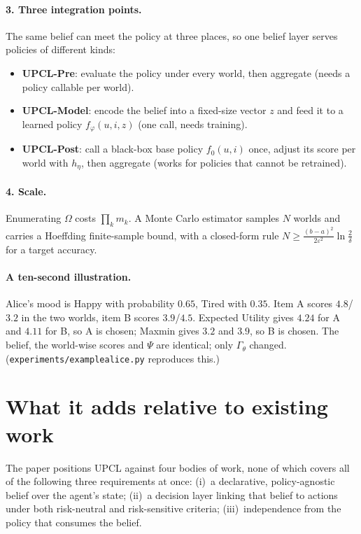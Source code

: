 \documentclass[11pt]{article}
\newcommand{\code}[1]{{\renewcommand{\_}{\textunderscore\hspace{0pt}}\texttt{#1}}}
\begin{document}
\paragraph{3. Three integration points.} The same belief can meet the policy at three places, so one belief layer serves policies of different kinds:
\begin{itemize}
\item \textbf{UPCL-Pre}: evaluate the policy under every world, then aggregate (needs a policy callable per world).
\item \textbf{UPCL-Model}: encode the belief into a fixed-size vector $z$ and feed it to a learned policy $f_\varphi(u,i,z)$ (one call, needs training).
\item \textbf{UPCL-Post}: call a black-box base policy $f_0(u,i)$ once, adjust its score per world with $h_\eta$, then aggregate (works for policies that cannot be retrained).
\end{itemize}

\paragraph{4. Scale.} Enumerating $\Omega$ costs $\prod_k m_k$. A Monte Carlo estimator samples $N$ worlds and carries a Hoeffding finite-sample bound, with a closed-form rule $N\ge\frac{(b-a)^2}{2\varepsilon^2}\ln\frac{2}{\delta}$ for a target accuracy.

\paragraph{A ten-second illustration.} Alice's mood is Happy with probability $0.65$, Tired with $0.35$. Item A scores $4.8$/$3.2$ in the two worlds, item B scores $3.9$/$4.5$. Expected Utility gives $4.24$ for A and $4.11$ for B, so A is chosen; Maxmin gives $3.2$ and $3.9$, so B is chosen. The belief, the world-wise scores and $\Psi$ are identical; only $\Gamma_\theta$ changed. (\code{experiments/example\_alice.py} reproduces this.)

\section{What it adds relative to existing work}

The paper positions UPCL against four bodies of work, none of which covers all of the following three requirements at once: (i)~a declarative, policy-agnostic belief over the agent's state; (ii)~a decision layer linking that belief to actions under both risk-neutral and risk-sensitive criteria; (iii)~independence from the policy that consumes the belief.
\end{document}

